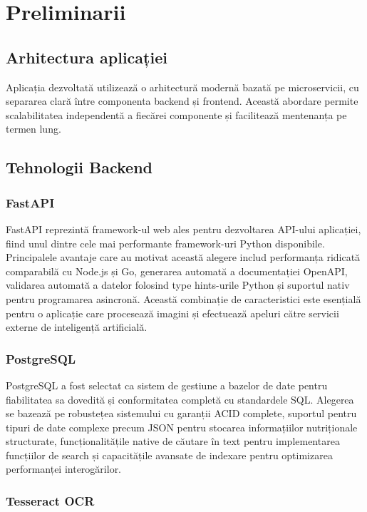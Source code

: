 \chapter{Preliminarii}

\section{Arhitectura aplicației}

Aplicația dezvoltată utilizează o arhitectură modernă bazată pe microservicii, cu separarea clară între componenta backend și frontend. Această abordare permite scalabilitatea independentă a fiecărei componente și facilitează mentenanța pe termen lung.

\section{Tehnologii Backend}

\subsection{FastAPI}

FastAPI reprezintă framework-ul web ales pentru dezvoltarea API-ului aplicației, fiind unul dintre cele mai performante framework-uri Python disponibile. Principalele avantaje care au motivat această alegere includ performanța ridicată comparabilă cu Node.js și Go, generarea automată a documentației OpenAPI, validarea automată a datelor folosind type hints-urile Python și suportul nativ pentru programarea asincronă. Această combinație de caracteristici este esențială pentru o aplicație care procesează imagini și efectuează apeluri către servicii externe de inteligență artificială.

\subsection{PostgreSQL}

PostgreSQL a fost selectat ca sistem de gestiune a bazelor de date pentru fiabilitatea sa dovedită și conformitatea completă cu standardele SQL. Alegerea se bazează pe robustețea sistemului cu garanții ACID complete, suportul pentru tipuri de date complexe precum JSON pentru stocarea informațiilor nutriționale structurate, funcționalitățile native de căutare în text pentru implementarea funcțiilor de search și capacitățile avansate de indexare pentru optimizarea performanței interogărilor.

\subsection{Tesseract OCR}


